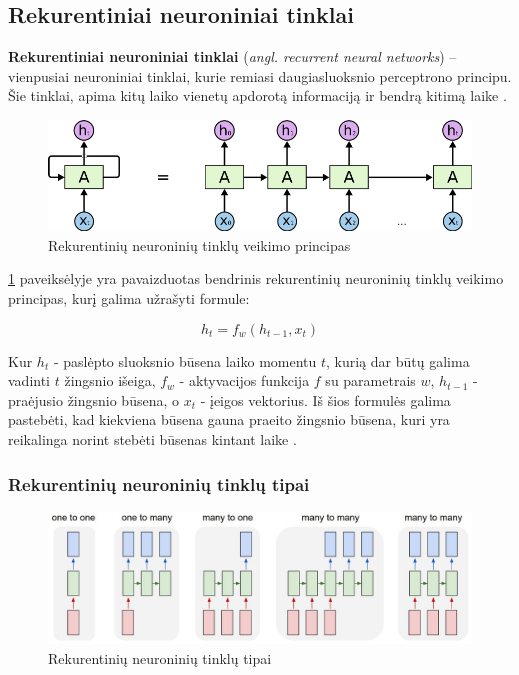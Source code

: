 \documentclass{VUMIFPSbakalaurinis}
\begin{document}
\subsection{Rekurentiniai neuroniniai tinklai}

\textbf{Rekurentiniai neuroniniai tinklai} (\textit{angl. recurrent neural networks}) – vienpusiai neuroniniai tinklai, kurie remiasi daugiasluoksnio perceptrono principu. Šie tinklai, apima kitų laiko vienetų apdorotą informaciją ir bendrą kitimą laike \cite{DBLP:journals/corr/Lipton15}.


\begin{figure}[H]
	\centering
	\includegraphics[scale=0.4]{img/rnn}
	\caption{Rekurentinių neuroninių tinklų veikimo principas}
	\label{img:rnn}
\end{figure}

\ref{img:rnn} paveiksėlyje yra pavaizduotas bendrinis rekurentinių neuroninių tinklų veikimo principas, kurį galima užrašyti formule:

\begin{equation}\label{eq:rnn}
h_t = f_w(h_{t-1}, x_t)
\end{equation}

Kur $h_t$ - paslėpto sluoksnio būsena laiko momentu $t$, kurią dar būtų galima vadinti $t$ žingsnio išeiga, $f_w$ - aktyvacijos funkcija $f$ su parametrais $w$, $h_{t-1}$ - praėjusio žingsnio būsena, o $x_t$ - įeigos vektorius. Iš šios formulės galima pastebėti, kad kiekviena būsena gauna praeito žingsnio būsena, kuri yra reikalinga norint stebėti būsenas kintant laike	.


\subsubsection{Rekurentinių neuroninių tinklų tipai}

\begin{figure}[H]
	\centering
	\includegraphics[scale=0.3]{img/nn-tipai}
	\caption{Rekurentinių neuroninių tinklų tipai}
	\label{img:tipai}
\end{figure}
\end{document}
